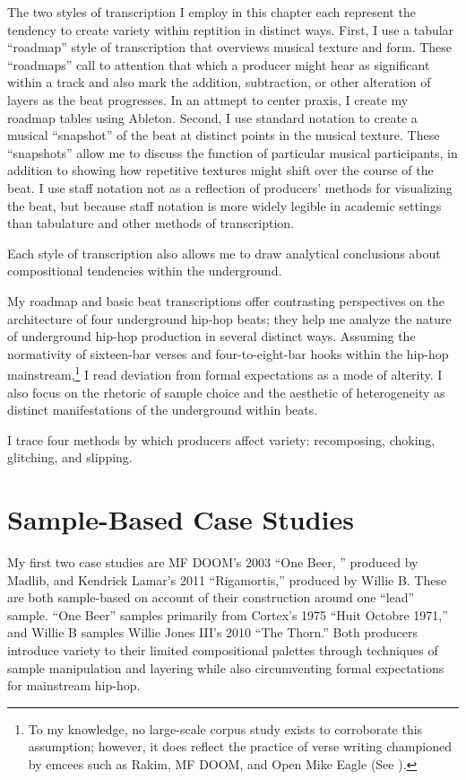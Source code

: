 The two styles of transcription I employ in this chapter each represent the tendency to create variety within reptition in distinct ways. First, I use a tabular “roadmap” style of transcription that overviews musical texture and form. These ``roadmaps'' call to attention that which a producer might hear as significant within a track and also mark the addition, subtraction, or other alteration of layers as the beat progresses. In an attmept to center praxis, I create my roadmap tables using Ableton. Second, I use standard notation to create a musical ``snapshot'' of the beat at distinct points in the musical texture. These ``snapshots'' allow me to discuss the function of particular musical participants, in addition to showing how repetitive textures might shift over the course of the beat. I use staff notation not as a reflection of producers' methods for visualizing the beat, but because staff notation is more widely legible in academic settings than tabulature and other methods of transcription.

Each style of transcription also allows me to draw analytical conclusions about compositional tendencies within the underground.

My roadmap and basic beat transcriptions offer contrasting perspectives on the architecture of four underground hip-hop beats; they help me analyze the nature of underground hip-hop production in several distinct ways. Assuming the normativity of sixteen-bar verses and four-to-eight-bar hooks within the hip-hop mainstream,\footnote{To my knowledge, no large-scale corpus study exists to corroborate this assumption; however, it does reflect the practice of verse writing championed by emcees such as Rakim, MF DOOM, and Open Mike Eagle (See \cite{estellecaswellRappingDeconstructedBest2016}).} I read deviation from formal expectations as a mode of alterity. I also focus on the rhetoric of sample choice and the aesthetic of heterogeneity as distinct manifestations of the underground within beats.

I trace four methods by which producers affect variety: recomposing, choking, glitching, and slipping. 
\clearpage

\singlespacing
\section{Sample-Based Case Studies}
My first two case studies are MF DOOM's 2003 ``One Beer, '' produced by Madlib, and Kendrick Lamar's 2011 ``Rigamortis,'' produced by Willie B. These are both sample-based on account of their construction around one ``lead'' sample. ``One Beer'' samples primarily from Cortex's 1975 ``Huit Octobre 1971,'' and Willie B samples Willie Jones III's 2010 ``The Thorn.'' Both producers introduce variety to their limited compositional palettes through techniques of sample manipulation and layering while also circumventing formal expectations for mainstream hip-hop.


